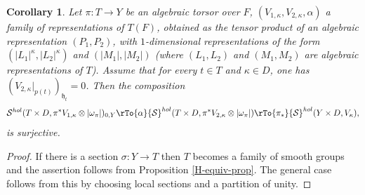 \documentclass[12pt,reqno]{amsart}
\newtheorem{cor}[theorem]{Corollary}
\theoremstyle{definition}
\theoremstyle{remark}
\numberwithin{equation}{section}
\newcommand{\ot}{\otimes}
\renewcommand{\SS}{{\mathcal S}}
\newcommand{\si}{\sigma}
\newcommand{\om}{\omega}
\renewcommand{\a}{\alpha}
\newcommand{\fh}{{\mathfrak h}}
\begin{document}
\begin{cor}\label{torsor-cor}
Let $\pi:T\to Y$ be an algebraic torsor over $F$, $(V_{1,\kappa},V_{2,\kappa},\a)$ a family of representations of $T(F)$, obtained as the tensor product of
an algebraic representation $(P_1,P_2)$, with $1$-dimensional representations of the form $(|L_1|^{\kappa},|L_2|^{\kappa})$ and 
$(|M_1|,|M_2|)$ (where $(L_1,L_2)$ and $(M_1,M_2)$ are algebraic representations of $T$). 
Assume that for every $t\in T$ and $\kappa\in D$, one has $(V_{2,\kappa}|_{p(t)})_{\fh_t}=0$. Then the composition
\begin{equation}\label{main-surj-eq}
\SS^{hol}(T\times D,\pi^*V_{1,\kappa}\ot |\om_\pi|)_{0,Y}\rTo{\a}\SS^{hol}(T\times D,\pi^*V_{2,\kappa}\ot |\om_\pi|)\rTo{\pi_*}\SS^{hol}(Y\times D,V_{\kappa}),
\end{equation}
is surjective.
\end{cor}

\begin{proof} If there is a section $\si:Y\to T$ then $T$ becomes a family of smooth groups and the assertion
follows from Proposition \ref{H-equiv-prop}. The general case follows from this by choosing local sections and a partition of unity.
\end{proof}
\end{document}

